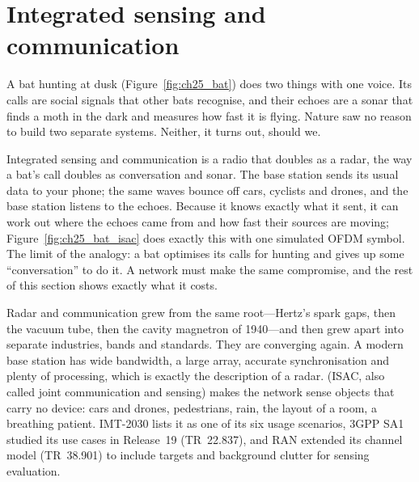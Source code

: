 \section{Integrated sensing and communication}
\label{sec:ch25:isac}

A bat hunting at dusk (Figure~\ref{fig:ch25_bat}) does two things with one voice. Its calls are
social signals that other bats recognise, and their echoes are a sonar that finds a moth in the dark
and measures how fast it is flying. Nature saw no reason to build two separate systems. Neither, it
turns out, should we.


\begin{analogy}
Integrated sensing and communication is a radio that doubles as a radar, the way a bat's call
doubles as conversation and sonar. The base station sends its usual data to your phone; the same
waves bounce off cars, cyclists and drones, and the base station listens to the echoes. Because it
knows exactly what it sent, it can work out where the echoes came from and how fast their sources
are moving; Figure~\ref{fig:ch25_bat_isac} does exactly this with one simulated OFDM symbol. The
limit of the analogy: a bat optimises its calls for hunting and gives up some
``conversation'' to do it. A network must make the same compromise, and the rest of this section
shows exactly what it costs.
\end{analogy}

Radar and communication grew from the same root---Hertz's spark gaps, then the vacuum tube, then the
cavity magnetron of 1940---and then grew apart into separate industries, bands and standards. They
are converging again. A modern base station has wide bandwidth, a large array, accurate
synchronisation and plenty of processing, which is exactly the description of a radar.
 (ISAC, also called joint communication and sensing) makes
the network sense objects that carry no device: cars and drones, pedestrians, rain, the layout of a
room, a breathing patient. IMT-2030 lists it as one of its six usage scenarios, 3GPP SA1 studied its
use cases in Release~19 (TR~22.837), and RAN extended its channel model (TR~38.901) to include
targets and background clutter for sensing evaluation.

